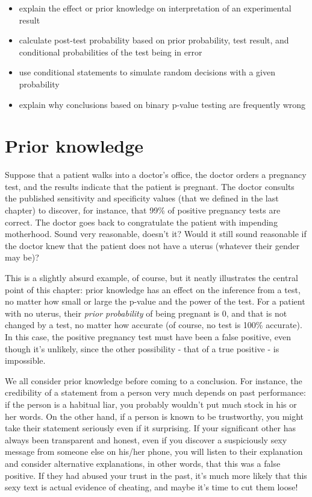 \documentclass[
  letterpaper,
  DIV=11,
  numbers=noendperiod]{scrreprt}
\providecommand{\tightlist}{%
  \setlength{\itemsep}{0pt}\setlength{\parskip}{0pt}}\usepackage{longtable,booktabs,array}
\begin{document}
\begin{itemize}
\tightlist
\item
  explain the effect or prior knowledge on interpretation of an
  experimental result
\item
  calculate post-test probability based on prior probability, test
  result, and conditional probabilities of the test being in error
\item
  use conditional statements to simulate random decisions with a given
  probability
\item
  explain why conclusions based on binary p-value testing are frequently
  wrong
\end{itemize}

\hypertarget{prior-knowledge}{%
\section{Prior knowledge}\label{prior-knowledge}}

\label{sec:model7}

Suppose that a patient walks into a doctor's office, the doctor orders a
pregnancy test, and the results indicate that the patient is pregnant.
The doctor consults the published sensitivity and specificity values
(that we defined in the last chapter) to discover, for instance, that
99\% of positive pregnancy tests are correct. The doctor goes back to
congratulate the patient with impending motherhood. Sound very
reasonable, doesn't it? Would it still sound reasonable if the doctor
knew that the patient does not have a uterus (whatever their gender may
be)?

This is a slightly absurd example, of course, but it neatly illustrates
the central point of this chapter: prior knowledge has an effect on the
inference from a test, no matter how small or large the p-value and the
power of the test. For a patient with no uterus, their \emph{prior
probability} of being pregnant is 0, and that is not changed by a test,
no matter how accurate (of course, no test is 100\% accurate). In this
case, the positive pregnancy test must have been a false positive, even
though it's unlikely, since the other possibility - that of a true
positive - is impossible.

We all consider prior knowledge before coming to a conclusion. For
instance, the credibility of a statement from a person very much depends
on past performance: if the person is a habitual liar, you probably
wouldn't put much stock in his or her words. On the other hand, if a
person is known to be trustworthy, you might take their statement
seriously even if it surprising. If your significant other has always
been transparent and honest, even if you discover a suspiciously sexy
message from someone else on his/her phone, you will listen to their
explanation and consider alternative explanations, in other words, that
this was a false positive. If they had abused your trust in the past,
it's much more likely that this sexy text is actual evidence of
cheating, and maybe it's time to cut them loose!
\end{document}
